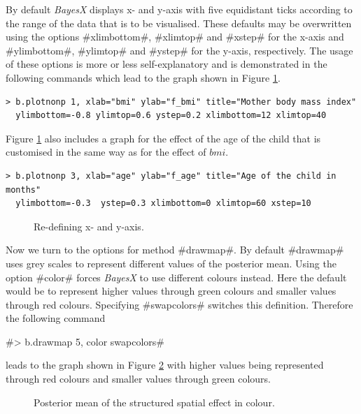 \documentclass{article}
\begin{document}
By default {\it BayesX} displays x- and y-axis with five
equidistant ticks according to the range of the data that is to be
visualised. These defaults may be overwritten using the options
#xlimbottom#, #xlimtop# and #xstep# for the x-axis and
#ylimbottom#, #ylimtop# and #ystep# for the y-axis, respectively.
The usage of these options is more or less self-explanatory and is
demonstrated in the following commands which lead to the graph
shown in Figure \ref{bmi6}.

\begin{verbatim}
> b.plotnonp 1, xlab="bmi" ylab="f_bmi" title="Mother body mass index"
  ylimbottom=-0.8 ylimtop=0.6 ystep=0.2 xlimbottom=12 xlimtop=40
\end{verbatim}

Figure \ref{bmi6} also includes a graph for the effect of the age
of the child that is customised in the same way as for the effect
of $bmi$.

\begin{verbatim}
> b.plotnonp 3, xlab="age" ylab="f_age" title="Age of the child in months"
  ylimbottom=-0.3  ystep=0.3 xlimbottom=0 xlimtop=60 xstep=10
\end{verbatim}

\begin{figure}[ht]
\begin{center}
{\it\caption{Re-defining x- and y-axis.\label{bmi6}}}
\end{center}
\end{figure}

Now we turn to the options for method #drawmap#. By default
#drawmap# uses grey scales to represent different values of the
posterior mean. Using the option #color# forces {\it BayesX} to
use different colours instead. Here the default would be to
represent higher values through green colours and smaller values
through red colours. Specifying #swapcolors# switches this
definition. Therefore the following command

#> b.drawmap 5, color swapcolors#

leads to the graph shown in Figure \ref{spat3} with higher values
being represented through red colours and smaller values through
green colours.

\begin{figure}[ht]
\begin{center}
{\it\caption{Posterior mean of the structured spatial effect in
colour.\label{spat3}}}
\end{center}
\end{figure}
\end{document}
